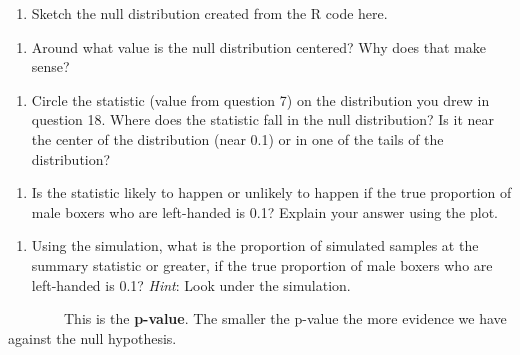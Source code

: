 \documentclass[
]{report}
\providecommand{\tightlist}{%
  \setlength{\itemsep}{0pt}\setlength{\parskip}{0pt}}
\begin{document}
\begin{enumerate}
\def\labelenumi{\arabic{enumi}.}
\setcounter{enumi}{17}
\tightlist
\item
  Sketch the null distribution created from the R code here.
\end{enumerate}

\vspace{1.8in}

\begin{enumerate}
\def\labelenumi{\arabic{enumi}.}
\setcounter{enumi}{18}
\tightlist
\item
  Around what value is the null distribution centered? Why does that make sense?
\end{enumerate}

\vspace{1in}

\begin{enumerate}
\def\labelenumi{\arabic{enumi}.}
\setcounter{enumi}{19}
\tightlist
\item
  Circle the statistic (value from question 7) on the distribution you drew in question 18. Where does the statistic fall in the null distribution? Is it near the center of the distribution (near 0.1) or in one of the tails of the distribution?
\end{enumerate}

\vspace{1in}

\begin{enumerate}
\def\labelenumi{\arabic{enumi}.}
\setcounter{enumi}{20}
\tightlist
\item
  Is the statistic likely to happen or unlikely to happen if the true proportion of male boxers who are left-handed is 0.1? Explain your answer using the plot.
\end{enumerate}

\vspace{1in}

\begin{enumerate}
\def\labelenumi{\arabic{enumi}.}
\setcounter{enumi}{21}
\tightlist
\item
  Using the simulation, what is the proportion of simulated samples at the summary statistic or greater, if the true proportion of male boxers who are left-handed is 0.1? \emph{Hint}: Look under the simulation.
\end{enumerate}

\vspace{1in}

~~~~~~~~This is the \textbf{p-value}. The smaller the p-value the more evidence we have against the null hypothesis.
\end{document}
